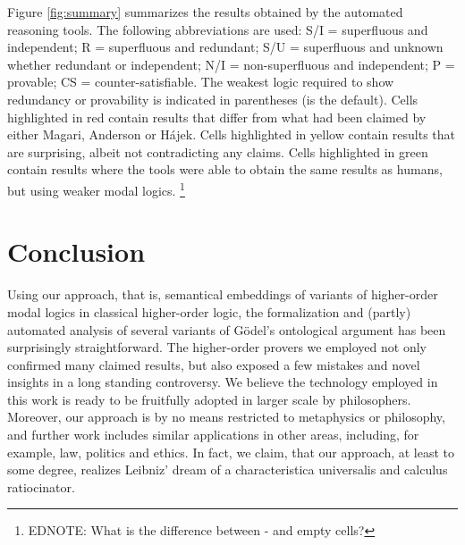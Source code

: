 \documentclass{birkjour}
\theoremstyle{definition}
\theoremstyle{remark}
\numberwithin{equation}{section}
\begin{document}
Figure \ref{fig:summary} summarizes the results obtained by the
automated reasoning tools. The following abbreviations are used: S/I =
superfluous and independent; R = superfluous and redundant; S/U =
superfluous and unknown whether redundant or independent; N/I =
non-superfluous and independent; P = provable; CS =
counter-satisfiable. The weakest logic required to show redundancy or
provability is indicated in parentheses (\K is the default).  Cells
highlighted in \colorbox{\tabred}{red} contain results that differ
from what had been claimed by either Magari, Anderson or Hájek. Cells
highlighted in \colorbox{\tabyellow}{yellow} contain results that are
surprising, albeit not contradicting any claims. Cells highlighted in
\colorbox{\tabgreen}{green} contain results where the tools were able
to obtain the same results as humans, but using weaker modal logics.
\footnote{EDNOTE: What is the difference between - and empty cells?}


\section{Conclusion}
Using our approach, that is, semantical embeddings of variants of higher-order
modal logics in classical higher-order logic, the formalization and
(partly) automated analysis of several variants of G\"odel's
ontological argument has been surprisingly straightforward. The
higher-order provers we employed not only confirmed many claimed results, but also exposed a
few mistakes and novel insights in a long standing controversy.  We
believe the technology employed in this work is ready to be fruitfully
adopted in larger scale by philosophers.  Moreover, our approach is
by no means restricted to metaphysics or philosophy, and further work
includes similar applications in other areas, including, for example,
law, politics and ethics. In fact, we claim, that our approach, at
least to some degree, realizes Leibniz' dream of a characteristica universalis
and calculus ratiocinator.







\sloppy
\printbibliography



\end{document}

